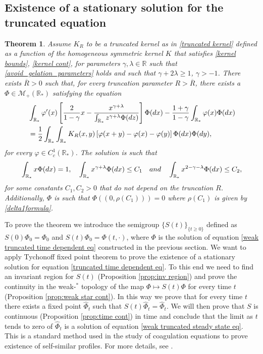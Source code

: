 \documentclass[11pt]{article}
\numberwithin{equation}{section}
\theoremstyle{plain}
\newtheorem{theorem}{Theorem}[section]
\newcommand{\der}{\textup{d}}
\begin{document}
\subsection{Existence of a stationary solution for the truncated equation} 
\begin{theorem}\label{thm:stationary truncated}
Assume $K_R $ to be a truncated kernel as in \eqref{truncated kernel} defined as a function of the homogeneous symmetric kernel $K$ that satisfies \eqref{kernel bounds},  \eqref{kernel cont},  for parameters $\gamma, \lambda \in \mathbb R$ such that \eqref{avoid_gelation_parameters} holds and such that $\gamma + 2\lambda \geq  1$, $ \gamma >-1 $. 
There exists $\overline R>0$ such that, for every truncation parameter $R> \overline R$, there exists a $\Phi \in \mathcal M_{+}(\mathbb R_*)$ satisfying the equation
\begin{align}\label{weak truncated steady state eq}
&  \int_{\mathbb R_*}  \varphi'(x) \left[ \frac{2}{1-\gamma}x - \frac{x^{\gamma + \lambda}}{\int_{\mathbb R_*}z^{\gamma +\lambda}\Phi(\der z)}  \right] \Phi(\der x) 
 - \frac{1+\gamma}{1-\gamma} \int_{\mathbb R_*}  \varphi(x) \Phi(\der x)\\
& =\frac{1}{2}\int_{\mathbb R_*} \int_{\mathbb R_*} K_R(x,y) \left[ \varphi(x+y)- \varphi(x) - \varphi(y) \right] \Phi( \der x) \Phi(\der y), \nonumber 
\end{align} 
for every $\varphi \in C^{1}_c(\mathbb R_*)$. 
The solution is such that
\begin{equation} \label{uniform bounds self-sol}
 \int_{\mathbb R_*} x \Phi(\der x) = 1,  \quad  \int_{\mathbb R_*} x^{\gamma +\lambda} \Phi(\der x) \leq C_{1} \quad \textup{and} \quad\int_{\mathbb R_*} x^{2-\gamma-\lambda} \Phi(\der x) \leq C_{2},
\end{equation} 
 for some constants $C_{1}, C_{2}>0$ that do not depend on the truncation $R$. Additionally, $\Phi$ is such that $\Phi((0, \rho(C_1)))=0$ where $\rho(C_1)$ is given by \eqref{delta1formula}.
\end{theorem}
To prove the theorem we introduce the semigroup $\{S(t)\}_{\{ t \geq 0\}}$ defined as 
$S(0)\Phi_0=\Phi_0$ and $S(t) \Phi_0 = \Phi(t, \cdot)$, where $\Phi$ is the solution of equation \eqref{weak truncated time dependent eq} constructed in the previous section.
We want to apply Tychonoff fixed point theorem to prove the existence of a stationary solution for equation \eqref{truncated time dependent eq}.
To this end we need to find an invariant region for $S(t)$ (Proposition \ref{prop:inv region}) and prove the continuity in the weak-$^{\ast}$ topology of the map $\Phi \mapsto S(t)\Phi$ for every time $t$ (Proposition \ref{prop:weak star cont}).
In this way we prove that for every time $t$ there exists a fixed point $\hat{\Phi}_t$ such that $S(t)\hat{\Phi}_t = \hat{\Phi}_t.$
We will then prove that $S$ is continuous (Proposition \ref{prop:time cont}) in time and conclude that the limit as $t$ tends to zero of $\hat{\Phi}_t $ is a solution of equation \eqref{weak truncated steady state eq}. This is a standard method used in the study of coagulation equations to prove existence of self-similar profiles. For more details, see \cite[Theorem 1.2]{escobedo2005self}.
\end{document}
